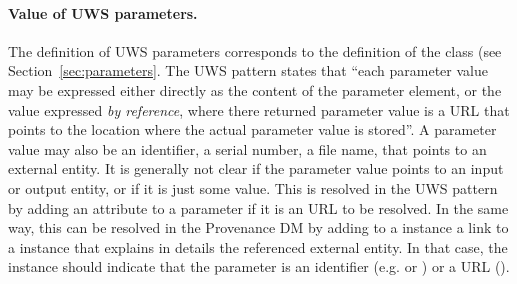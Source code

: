 \paragraph{Value of UWS parameters.}
The definition of UWS parameters corresponds to the definition of the  class (see Section~\ref{sec:parameters}. 
The UWS pattern states that ``each parameter value may be expressed either directly as the content of the parameter element, or the value expressed \emph{by reference}, where there returned parameter value is a URL that points to the location where the actual parameter value is stored''.
A parameter value may also be an identifier, a serial number, a file name, that points to an external entity. 
It is generally not clear if the parameter value points to an input or output entity, or if it is just some value. 
This is resolved in the UWS pattern \citep{std:UWS} by adding an attribute  to a parameter if it is an URL to be resolved.
In the same way, this can be resolved in the Provenance DM by adding to a  instance a link to a  instance that explains in details the referenced external entity.
In that case, the  instance should indicate that the parameter is an identifier (e.g.  or ) or a URL ().



